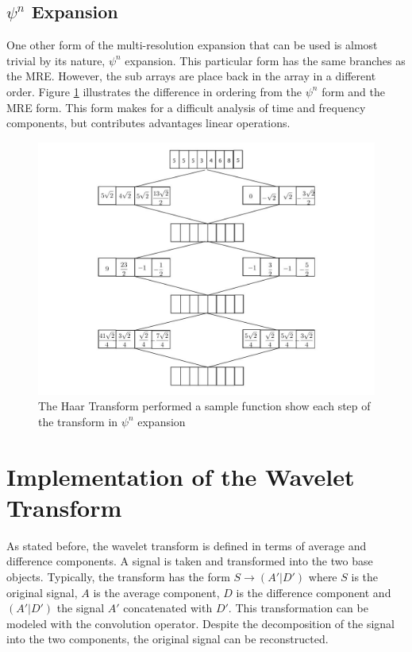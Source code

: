   
\subsection {$\psi^n$ Expansion}
One other form of the multi-resolution expansion that can be used is almost trivial by its nature, $\psi^n$ expansion.  This particular form has the same branches as the MRE.  However, the sub arrays are place back in the array in a different order.    Figure \ref{numpsin} illustrates the difference in ordering from the $\psi^n$ form and the MRE form.    This form makes for a difficult analysis of time and frequency components, but contributes advantages linear operations.
\begin{figure}
\includegraphics [width=6in]{psinexpansion.jpg}
\caption{The Haar Transform performed a sample function show each step of the transform in $\psi^n$ expansion }
\label{numpsin}
\end{figure}

\section{Implementation of the Wavelet Transform} \label{sec:implementation}

As stated before, the wavelet transform is defined in terms of average
and difference components. A signal is taken and transformed into the
two base objects.  Typically, the transform has the form $S\rightarrow
(A'|D')$ where $S$ is the original signal, $A$ is the average component,
$D$ is the difference component and $(A'|D')$ the signal $A'$
concatenated with $D'$.  This transformation can be modeled with the
convolution operator. Despite the decomposition of the signal into the
two components, the original signal can be reconstructed.

